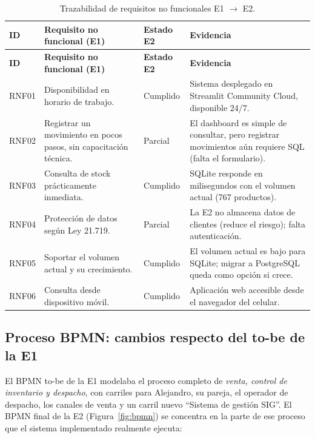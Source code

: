 \documentclass[11pt,letterpaper]{article}
\renewcommand{\_}{\oldus\allowbreak}
\newcommand{\cumple}{Cumplido}
\newcommand{\parcial}{Parcial}
\begin{document}
\begin{small}
\begin{longtable}{>{\raggedright\arraybackslash}p{1.2cm} >{\raggedright\arraybackslash}p{4.0cm} >{\raggedright\arraybackslash}p{2.0cm} >{\raggedright\arraybackslash}p{6.6cm}}
\caption{Trazabilidad de requisitos no funcionales E1 $\rightarrow$ E2.}\\
\toprule
\textbf{ID} & \textbf{Requisito no funcional (E1)} & \textbf{Estado E2} & \textbf{Evidencia} \\
\midrule
\endfirsthead
\toprule
\textbf{ID} & \textbf{Requisito no funcional (E1)} & \textbf{Estado E2} & \textbf{Evidencia} \\
\midrule
\endhead
\bottomrule
\endfoot
RNF01 & Disponibilidad en horario de trabajo. & \cumple & Sistema desplegado en Streamlit Community Cloud, disponible 24/7. \\
RNF02 & Registrar un movimiento en pocos pasos, sin capacitación técnica. & \parcial & El dashboard es simple de consultar, pero registrar movimientos aún requiere SQL (falta el formulario). \\
RNF03 & Consulta de stock prácticamente inmediata. & \cumple & SQLite responde en milisegundos con el volumen actual (767 productos). \\
RNF04 & Protección de datos según Ley 21.719. & \parcial & La E2 no almacena datos de clientes (reduce el riesgo); falta autenticación. \\
RNF05 & Soportar el volumen actual y su crecimiento. & \cumple & El volumen actual es bajo para SQLite; migrar a PostgreSQL queda como opción si crece. \\
RNF06 & Consulta desde dispositivo móvil. & \cumple & Aplicación web accesible desde el navegador del celular. \\
\end{longtable}
\end{small}

\subsection{Proceso BPMN: cambios respecto del to-be de la E1}
El BPMN to-be de la E1 modelaba el proceso completo de \emph{venta, control de inventario y despacho}, con carriles para Alejandro, su pareja, el operador de despacho, los canales de venta y un carril nuevo “Sistema de gestión SIG”. El BPMN final de la E2 (Figura~\ref{fig:bpmn}) se concentra en la parte de ese proceso que el sistema implementado realmente ejecuta:
\end{document}
